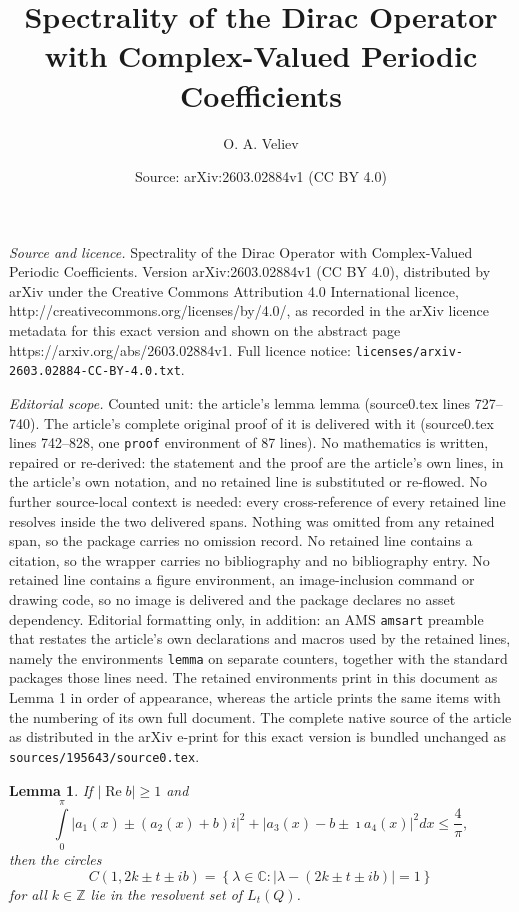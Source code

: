 \documentclass[10pt,a4paper]{amsart}
\title{Spectrality of the Dirac Operator with Complex-Valued Periodic Coefficients}
\author{O. A. Veliev}
\date{Source: arXiv:2603.02884v1 (CC BY 4.0)}
\newtheorem{lemma}{Lemma}
\begin{document}
\maketitle

\noindent\emph{Source and licence.} Spectrality of the Dirac Operator with Complex-Valued Periodic Coefficients. Version arXiv:2603.02884v1 (CC BY 4.0), distributed by arXiv under the Creative Commons Attribution 4.0 International licence, http://creativecommons.org/licenses/by/4.0/, as recorded in the arXiv licence metadata for this exact version and shown on the abstract page https://arxiv.org/abs/2603.02884v1. Full licence notice: \texttt{licenses/arxiv-2603.02884-CC-BY-4.0.txt}.\par\smallskip

\noindent\textit{Editorial scope.} Counted unit: the article's lemma lemma (source0.tex lines 727--740). The article's complete original proof of it is delivered with it (source0.tex lines 742--828, one \texttt{proof} environment of 87 lines). No mathematics is written, repaired or re-derived: the statement and the proof are the article's own lines, in the article's own notation, and no retained line is substituted or re-flowed.  No further source-local context is needed: every cross-reference of every retained line resolves inside the two delivered spans.  Nothing was omitted from any retained span, so the package carries no omission record.  No retained line contains a citation, so the wrapper carries no bibliography and no bibliography entry.  No retained line contains a figure environment, an image-inclusion command or drawing code, so no image is delivered and the package declares no asset dependency.  Editorial formatting only, in addition: an AMS \texttt{amsart} preamble that restates the article's own declarations and macros used by the retained lines, namely the environments \texttt{lemma} on separate counters, together with the standard packages those lines need.  The retained environments print in this document as Lemma 1 in order of appearance, whereas the article prints the same items with the numbering of its own full document.  The complete native source of the article as distributed in the arXiv e-print for this exact version is bundled unchanged as \texttt{sources/195643/source0.tex}.
\begin{lemma}
If $\left\vert \operatorname{Re}b\right\vert \geq1$ and
\begin{equation}
\int\limits_{0}^{\pi}\left\vert a_{1}(x)\pm\left(  a_{2}(x)+b\right)
i\right\vert ^{2}+\left\vert a_{3}(x)-b\pm\imath a_{4}(x)\right\vert
^{2}dx\leq\frac{4}{\pi}, \tag{27}%
\end{equation}
then the circles
\[
C(1,2k\pm t\pm ib)=\left\{  \lambda\in\mathbb{C}:\left\vert \lambda-(2k\pm
t\pm ib)\right\vert =1\right\}
\]
for all $k\in\mathbb{Z}$ lie in the resolvent set of $L_{t}(Q)$.
\end{lemma}
\end{document}
